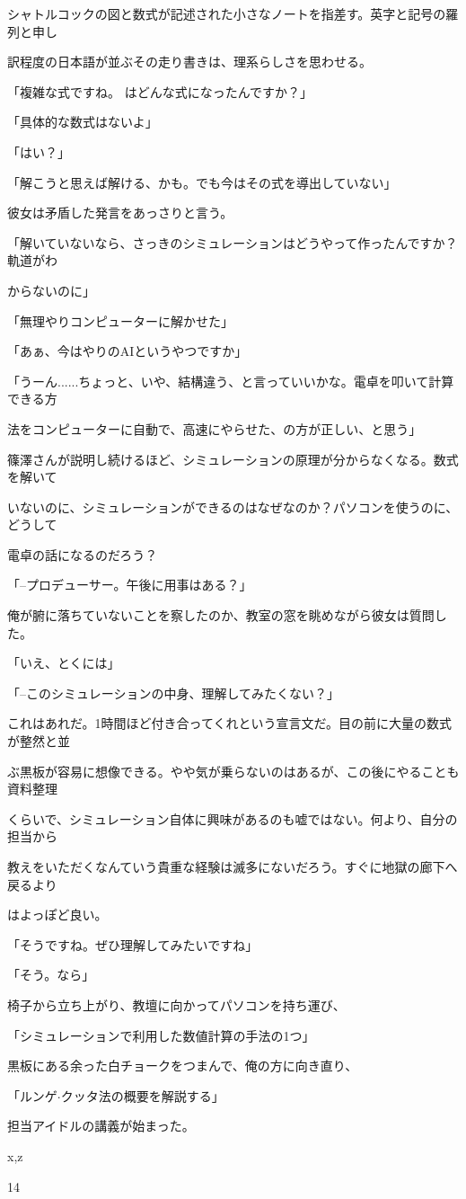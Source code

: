 シャトルコックの図と数式が記述された⼩さなノートを指差す。英字と記号の羅列と申し\par
訳程度の⽇本語が並ぶその⾛り書きは、理系らしさを思わせる。\par
「複雑な式ですね。 はどんな式になったんですか？」\par
「具体的な数式はないよ」\par
「はい？」\par
「解こうと思えば解ける、かも。でも今はその式を導出していない」\par
彼⼥は⽭盾した発⾔をあっさりと⾔う。\par
「解いていないなら、さっきのシミュレーションはどうやって作ったんですか？軌道がわ\par
からないのに」\par
「無理やりコンピューターに解かせた」\par
「あぁ、今はやりのAIというやつですか」\par
「うーん......ちょっと、いや、結構違う、と⾔っていいかな。電卓を叩いて計算できる⽅\par
法をコンピューターに⾃動で、⾼速にやらせた、の⽅が正しい、と思う」\par
篠澤さんが説明し続けるほど、シミュレーションの原理が分からなくなる。数式を解いて\par
いないのに、シミュレーションができるのはなぜなのか？パソコンを使うのに、どうして\par
電卓の話になるのだろう？\par
「--プロデューサー。午後に⽤事はある？」\par
俺が腑に落ちていないことを察したのか、教室の窓を眺めながら彼⼥は質問した。\par
「いえ、とくには」\par
「--このシミュレーションの中⾝、理解してみたくない？」\par
これはあれだ。1時間ほど付き合ってくれという宣⾔⽂だ。⽬の前に⼤量の数式が整然と並\par
ぶ黒板が容易に想像できる。やや気が乗らないのはあるが、この後にやることも資料整理\par
くらいで、シミュレーション⾃体に興味があるのも嘘ではない。何より、⾃分の担当から\par
教えをいただくなんていう貴重な経験は滅多にないだろう。すぐに地獄の廊下へ戻るより\par
はよっぽど良い。\par
「そうですね。ぜひ理解してみたいですね」\par
「そう。なら」\par
椅⼦から⽴ち上がり、教壇に向かってパソコンを持ち運び、\par
「シミュレーションで利⽤した数値計算の⼿法の1つ」\par
黒板にある余った⽩チョークをつまんで、俺の⽅に向き直り、\par
「ルンゲ$\cdot$クッタ法の概要を解説する」\par
担当アイドルの講義が始まった。\par
x,z\par
14\par

